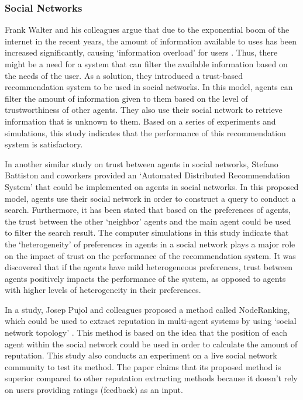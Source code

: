 \documentclass[runningheads,a4paper]{llncs}
\begin{document}
\subsubsection{Social Networks}
Frank Walter and his colleagues argue that due to the exponential boom of the internet in the recent years, the amount of information available to uses has been increased significantly, causing `information overload' for users \cite{walter2008model}. Thus, there might be a need for a system that can filter the available information based on the needs of the user. As a solution, they introduced a trust-based recommendation system to be used in social networks. In this model, agents can filter the amount of information given to them based on the level of trustworthiness of other agents. They also use their social network to retrieve information that is unknown to them. Based on a series of experiments and simulations, this study indicates that the performance of this recommendation system is satisfactory.

In another similar study on trust between agents in social networks, Stefano Battiston and coworkers \cite{battiston2006impact} provided an `Automated Distributed Recommendation
System' that could be implemented on agents in social networks. In this proposed model, agents use their social network in order to construct a query to conduct a search. Furthermore, it has been stated that based on the preferences of agents, the trust between the other `neighbor' agents and the main agent could be used to filter the search result. The computer simulations in this study indicate that the `heterogeneity' of preferences in agents in a social network plays a major role on the impact of trust on the performance of the recommendation system. It was discovered that if the agents have mild heterogeneous preferences, trust between agents positively impacts the performance of the system, as opposed to agents with higher levels of heterogeneity in their preferences.

In a study, Josep Pujol and colleagues proposed a method called NodeRanking, which could be used to extract reputation in multi-agent systems by using `social network topology' \cite{pujol2002extracting}. This method is based on the idea that the position of each agent within the social network could be used in order to calculate the amount of reputation. This study also conducts an experiment on a live social network community to test its method. The paper claims that its proposed method is superior compared to other reputation extracting methods because it doesn't rely on users providing ratings (feedback) as an input.
\end{document}
